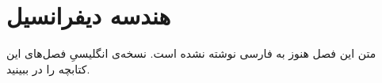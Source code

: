 \chapter{هندسه دیفرانسیل}
\label{ch:10-differential-geometry-fa-01}

متن این فصل هنوز به فارسی نوشته نشده است. نسخه‌ی انگلیسیِ فصل‌های این کتابچه را در  ببینید.
